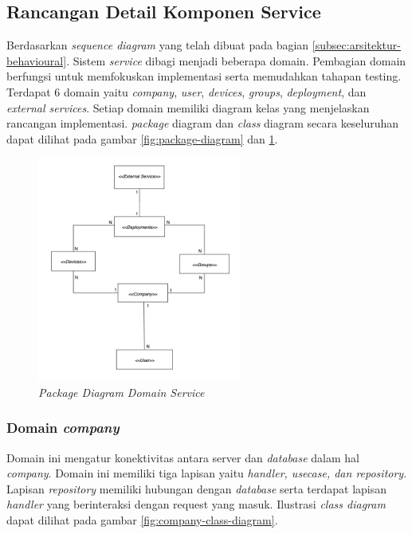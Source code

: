 \subsection{Rancangan Detail Komponen Service}
\label{sec:rancangan-service}

Berdasarkan \textit{sequence diagram} yang telah dibuat pada bagian \ref{subsec:arsitektur-behavioural}. Sistem \textit{service} dibagi menjadi beberapa domain. Pembagian domain berfungsi untuk memfokuskan implementasi serta memudahkan tahapan testing. Terdapat 6 domain yaitu \textit{company}, \textit{user}, \textit{devices}, \textit{groups}, \textit{deployment}, dan \textit{external services}. Setiap domain memiliki diagram kelas yang menjelaskan rancangan implementasi. \textit{package} diagram dan \textit{class} diagram secara keseluruhan dapat dilihat pada gambar \ref{fig:package-diagram} dan \ref{fig:package-class-domain-diagram}.
\begin{figure}[ht]
  \centering
  \includegraphics[width=0.6\textwidth]{resources/chapter-3/class/class-diagram-overall.jpg}
  \caption{\textit{Package Diagram Domain Service}}
  \label{fig:package-class-domain-diagram}
\end{figure}

\pagebreak

\subsubsection{Domain \textit{company}}

Domain ini mengatur konektivitas antara server dan \textit{database} dalam hal \textit{company}. Domain ini memiliki tiga lapisan yaitu \textit{handler, usecase, dan repository}. Lapisan \textit{repository} memiliki hubungan dengan \textit{database} serta terdapat lapisan \textit{handler} yang berinteraksi dengan request yang masuk. Ilustrasi \textit{class diagram} dapat dilihat pada gambar \ref{fig:company-class-diagram}.

